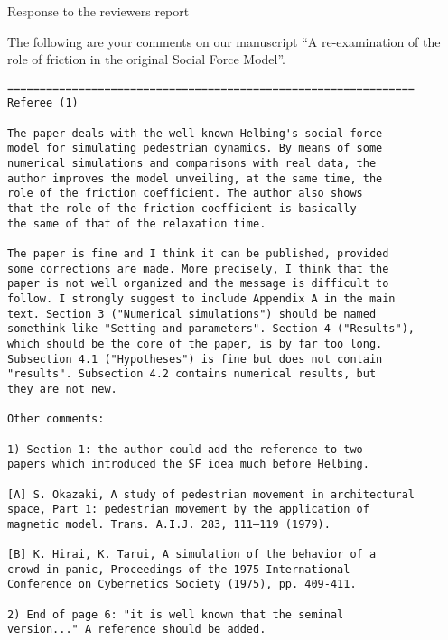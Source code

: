 \documentclass[a4paper,12pt]{letter}
\begin{document}

\begin{letter}{Response to the reviewers report}

\opening{}

The following are your comments on our manuscript ``A re-examination of the role 
of friction in the original Social Force Model''. 



\begin{verbatim}
===============================================================
Referee (1)

The paper deals with the well known Helbing's social force 
model for simulating pedestrian dynamics. By means of some 
numerical simulations and comparisons with real data, the 
author improves the model unveiling, at the same time, the 
role of the friction coefficient. The author also shows 
that the role of the friction coefficient is basically 
the same of that of the relaxation time.

The paper is fine and I think it can be published, provided 
some corrections are made. More precisely, I think that the 
paper is not well organized and the message is difficult to 
follow. I strongly suggest to include Appendix A in the main 
text. Section 3 ("Numerical simulations") should be named 
somethink like "Setting and parameters". Section 4 ("Results"),
which should be the core of the paper, is by far too long. 
Subsection 4.1 ("Hypotheses") is fine but does not contain 
"results". Subsection 4.2 contains numerical results, but 
they are not new.

Other comments:

1) Section 1: the author could add the reference to two 
papers which introduced the SF idea much before Helbing.

[A] S. Okazaki, A study of pedestrian movement in architectural
space, Part 1: pedestrian movement by the application of 
magnetic model. Trans. A.I.J. 283, 111–119 (1979).

[B] K. Hirai, K. Tarui, A simulation of the behavior of a 
crowd in panic, Proceedings of the 1975 International 
Conference on Cybernetics Society (1975), pp. 409-411.

2) End of page 6: "it is well known that the seminal 
version..." A reference should be added.


\end{verbatim}
\end{letter}
\end{document}
